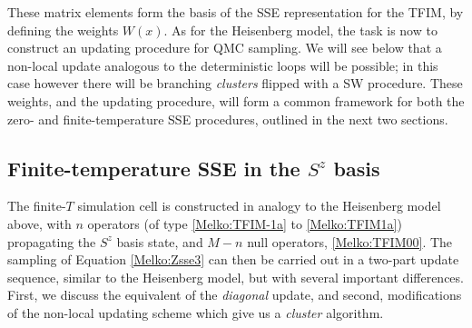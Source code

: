 \documentclass[vecphys]{svmult}
\begin{document}
These matrix elements form the basis of the SSE representation for the TFIM, by defining the weights $W(x)$.  As for the Heisenberg model, the task is now to construct an updating procedure for QMC sampling.
We will see below that a non-local update analogous to the deterministic loops will be possible; in this case however there will be branching {\it clusters} flipped with a SW procedure.  These weights, and the updating procedure, will form a common framework for both the zero- and finite-temperature SSE procedures, outlined in the next two sections.  

\subsection{Finite-temperature SSE in the $S^z$ basis} \label{Melko:TFIMfiniteT}

The finite-$T$ simulation cell is constructed in analogy to the Heisenberg model above, with $n$ operators (of type \ref{Melko:TFIM-1a} to \ref{Melko:TFIM1a}) propagating the $S^z$ basis state, and $M-n$ null operators, \ref{Melko:TFIM00}.
The sampling of Equation \ref{Melko:Zsse3} can then be carried out in a two-part update sequence, similar to the Heisenberg model, but with several important differences.  First, we discuss the equivalent of the {\em diagonal} update, and second, modifications of the non-local updating scheme which give us a {\em cluster} algorithm.
\end{document}
